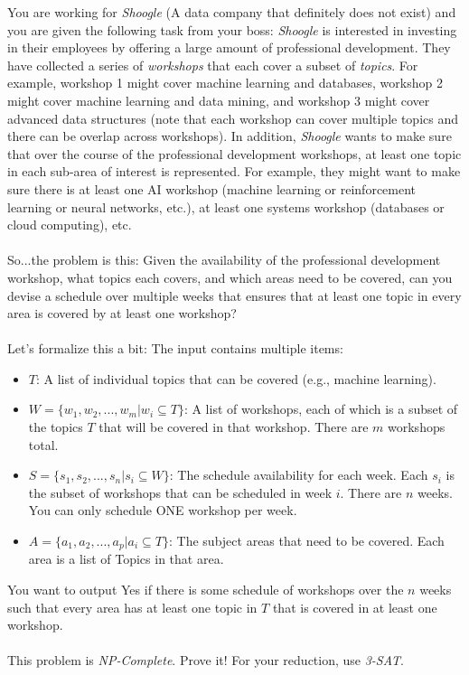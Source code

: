 \documentclass{article}
\begin{document}
You are working for \emph{Shoogle} (A data company that definitely does not exist) and you are given the following task from your boss: \emph{Shoogle} is interested in investing in their employees by offering a large amount of professional development. They have collected a series of \emph{workshops} that each cover a subset of \emph{topics}. For example, workshop 1 might cover machine learning and databases, workshop 2 might cover machine learning and data mining, and workshop 3 might cover advanced data structures (note that each workshop can cover multiple topics and there can be overlap across workshops). In addition, \emph{Shoogle} wants to make sure that over the course of the professional development workshops, at least one topic in each sub-area of interest is represented. For example, they might want to make sure there is at least one AI workshop (machine learning or reinforcement learning or neural networks, etc.), at least one systems workshop (databases or cloud computing), etc.\\
\\
So...the problem is this: Given the availability of the professional development workshop, what topics each covers, and which areas need to be covered, can you devise a schedule over multiple weeks that ensures that at least one topic in every area is covered by at least one workshop?\\
\\
Let's formalize this a bit: The input contains multiple items:

\begin{itemize}
    \item $T$: A list of individual topics that can be covered (e.g., machine learning).
    \item $W=\{w_1,w_2,...,w_m | w_i \subseteq T\}$: A list of workshops, each of which is a subset of the topics $T$ that will be covered in that workshop. There are $m$ workshops total.
    
    \item $S=\{s_1,s_2,...,s_n | s_i \subseteq W\}$: The schedule availability for each week. Each $s_i$ is the subset of workshops that can be scheduled in week $i$. There are $n$ weeks. You can only schedule ONE workshop per week.
    \item $A= \{a_1,a_2,...,a_p | a_i \subseteq T\}$: The subject areas that need to be covered. Each area is a list of Topics in that area.
\end{itemize}

You want to output Yes if there is some schedule of workshops over the $n$ weeks such that every area has at least one topic in $T$ that is covered in at least one workshop.\\
\\
This problem is \emph{NP-Complete}. Prove it! For your reduction, use \emph{3-SAT}.
\end{document}
